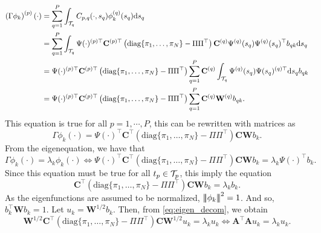 \begin{align*}
    \left(\Gamma \phi_k\right)^{(p)}(\cdot) &= \sum_{q = 1}^P \int_{\mathcal{T}_{q}} C_{p, q}(\cdot, s_q)\phi_k^{(q)}(s_q) {\rm d} s_q \\
    &= \sum_{q = 1}^P \int_{\mathcal{T}_{q}} \Psi(\cdot)^{(p) \top} \mathbf{C}^{(p) \top} \left(\text{diag}\{\pi_1, \dots, \pi_N\} - \Pi\Pi^\top\right)\mathbf{C}^{(q)} \Psi^{(q)}(s_q) \Psi^{(q)}(s_q)^\top b_{q k} {\rm d} s_q \\
    &= \Psi(\cdot)^{(p) \top} \mathbf{C}^{(p) \top} \left(\text{diag}\{\pi_1, \dots, \pi_N\} - \Pi\Pi^\top\right)\sum_{q = 1}^P \mathbf{C}^{(q)} \int_{\mathcal{T}_{q}} \Psi^{(q)}(s_q) \Psi(s_q)^{(q) \top} {\rm d} s_q b_{q k} \\
    &= \Psi(\cdot)^{(p) \top} \mathbf{C}^{(p) \top} \left(\text{diag}\{\pi_1, \dots, \pi_N\} - \Pi\Pi^\top\right) \sum_{q = 1}^P \mathbf{C}^{(q)} \mathbf{W}^{(q)} b_{q k}. \\
\end{align*}
This equation is true for all $p = 1, \cdots, P$, this can be rewritten with matrices as
\begin{equation}
    \Gamma \phi_k(\cdot) = \Psi(\cdot)^{\top} \mathbf{C}^{\top} \left(\text{diag}\{\pi_1, \dots, \pi_N\} - \Pi\Pi^\top\right) \mathbf{C} \mathbf{W} b_{k}.
\end{equation}
From the eigenequation, we have that
\begin{equation}
    \Gamma \phi_k(\cdot) = \lambda_k \phi_k(\cdot) \Longleftrightarrow \Psi(\cdot)^{\top} \mathbf{C}^{\top} \left(\text{diag}\{\pi_1, \dots, \pi_N\} - \Pi\Pi^\top\right) \mathbf{C} \mathbf{W} b_{k} = \lambda_k \Psi(\cdot)^\top b_k.
\end{equation}
Since this equation must be true for all $t_p \in \mathcal{T}_{p}$, this imply the equation
\begin{equation}\label{eq:eigen_decom}
    \mathbf{C}^{\top} \left(\text{diag}\{\pi_1, \dots, \pi_N\} - \Pi\Pi^\top\right) \mathbf{C} \mathbf{W} b_{k} = \lambda_k b_k.
\end{equation}
As the eigenfunctions are assumed to be normalized, $\left|\!\left|\!\left|\phi_k\right|\!\right|\!\right|^2 = 1$. And so, $b_k^\top \mathbf{W} b_k = 1$. Let $u_k = \mathbf{W}^{1/2}b_k$. Then, from \eqref{eq:eigen_decom}, we obtain
\begin{equation}\label{eq:eigen_cov_op}
    \mathbf{W}^{1/2} \mathbf{C}^{\top} \left(\text{diag}\{\pi_1, \dots, \pi_N\} - \Pi\Pi^\top\right) \mathbf{C} \mathbf{W}^{1/2} u_k = \lambda_k u_k \Longleftrightarrow \mathbf{A}^\top\mathbf{A} u_k = \lambda_k u_k.
\end{equation}
